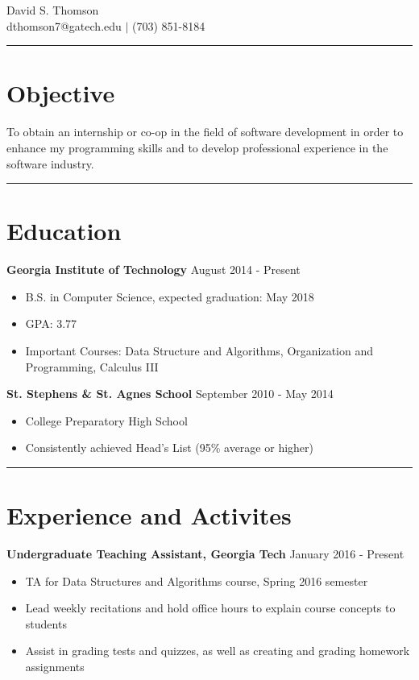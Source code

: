 \documentclass[11pt]{article}
\begin{document}
\begin{center}
{\huge David S. Thomson} \\
\vspace*{1em}
dthomson7@gatech.edu $\vert$ (703) 851-8184
\end{center}

\rule{\textwidth}{.5pt}

\section*{Objective}
To obtain an internship or co-op in the field of software development in order to enhance my programming skills and to develop professional experience in the software industry.

\rule{\textwidth}{.5pt}

\section*{Education}
\textbf{Georgia Institute of Technology} \hfill August 2014 - Present
\begin{itemize}
\setlength\itemsep{0.5pt}
    \item B.S. in Computer Science, expected graduation: May 2018
    \item GPA: 3.77
    \item Important Courses: Data Structure and Algorithms, Organization and Programming, Calculus III %
\end{itemize}

\textbf{St. Stephens \& St. Agnes School} \hfill September 2010 - May 2014
\begin{itemize}
\setlength\itemsep{0.5pt}
    \item College Preparatory High School
    \item Consistently achieved Head's List (95\% average or higher)
\end{itemize}

\rule{\textwidth}{.5pt}

\section*{Experience and Activites}
\textbf{Undergraduate Teaching Assistant, Georgia Tech} \hfill January 2016 - Present
\begin{itemize}
\setlength\itemsep{0.5pt}
    \item TA for Data Structures and Algorithms course, Spring 2016 semester
    \item Lead weekly recitations and hold office hours to explain course concepts to students
    \item Assist in grading tests and quizzes, as well as creating and grading homework assignments
\end{itemize}
\end{document}
